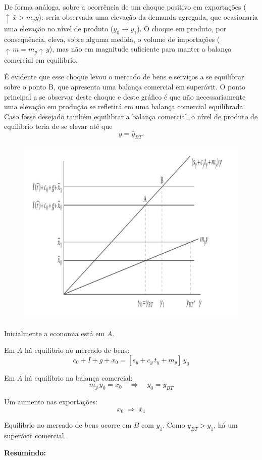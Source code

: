 \documentclass[a4paper,12pt]{article}[abntex2]
\begin{document}
De forma análoga, sobre a ocorrência de um choque positivo em exportações ($\uparrow\,\bar{x} > m_y y$):  
seria observada uma elevação da demanda agregada, que ocasionaria uma elevação no nível de produto ($y_0 \rightarrow y_1$).  
O choque em produto, por consequência, eleva, sobre alguma medida, o volume de importações ($\uparrow\, m = m_y \uparrow\, y$), mas não em magnitude suficiente para manter a balança comercial em equilíbrio.  

É evidente que esse choque levou o mercado de bens e serviços a se equilibrar sobre o ponto B, que apresenta uma balança comercial em superávit.  
O ponto principal a se observar deste choque e deste gráfico é que não necessariamente uma elevação em produção se refletirá em uma balança comercial equilibrada.  
Caso fosse desejado também equilibrar a balança comercial, o nível de produto de equilíbrio teria de se elevar até que 
\[
y = \bar{y}_{BT}.
\]


\begin{figure}[H]
    \centering
    \includegraphics[width=0.7\linewidth]{Imagens/a20i2.png}
\end{figure}

Inicialmente a economia está em \(A\).

\- Em \(A\) há equilíbrio no mercado de bens:
\[
c_0 + I + g + x_0 = [s_y + c_y\,t_y + m_y]\,y_0
\]

\- Em \(A\) há equilíbrio na balança comercial:
\[
m_y\,y_0 = x_0
\quad\Longrightarrow\quad
y_0 = y_{BT}
\]

\- Um aumento nas exportações:
\[
x_0 \;\Longrightarrow\; \bar{x}_1
\]

\- Equilíbrio no mercado de bens ocorre em \(B\) com \(y_1\).  
Como \(y_{BT} > y_1\), há um superávit comercial.


\textbf{Resumindo:}
\end{document}
